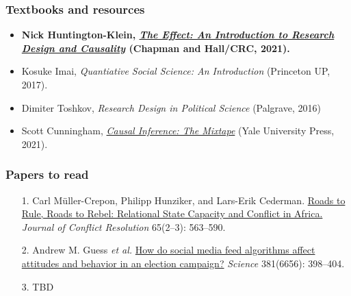 \documentclass[aspectratio=43]{beamer}
\begin{document}
\begin{frame}
\frametitle{Textbooks and resources}
\centering

\begin{itemize}
  \item \textbf{Nick Huntington-Klein, \href{https://theeffectbook.net/}{\textit{The Effect: An Introduction to Research Design and Causality}} (Chapman and Hall/CRC, 2021).}
  \item Kosuke Imai, \textit{Quantiative Social Science: An Introduction} (Princeton UP, 2017).
  \item Dimiter Toshkov, \textit{Research Design in Political Science} (Palgrave, 2016)
  \item Scott Cunningham, \href{https://mixtape.scunning.com/}{\textit{Causal Inference: The Mixtape}} (Yale University Press, 2021).
\end{itemize}

\end{frame}

\begin{frame}
\frametitle{Papers to read}
\centering

\begin{itemize}
  \item[1.] Carl Müller-Crepon, Philipp Hunziker, and Lars-Erik Cederman. \href{https://journals.sagepub.com/doi/10.1177/0022002720963674}{Roads to Rule, Roads to Rebel: Relational State Capacity and Conflict in Africa.} \textit{Journal of Conflict Resolution} 65(2--3): 563--590.
  \item[2.] Andrew M. Guess \textit{et al.} \href{https://www.science.org/doi/10.1126/science.abp9364}{How do social media feed algorithms affect attitudes and behavior in an election campaign?} \textit{Science} 381(6656): 398--404.
  \item[3.] TBD
\end{itemize}

\end{frame}
\end{document}

